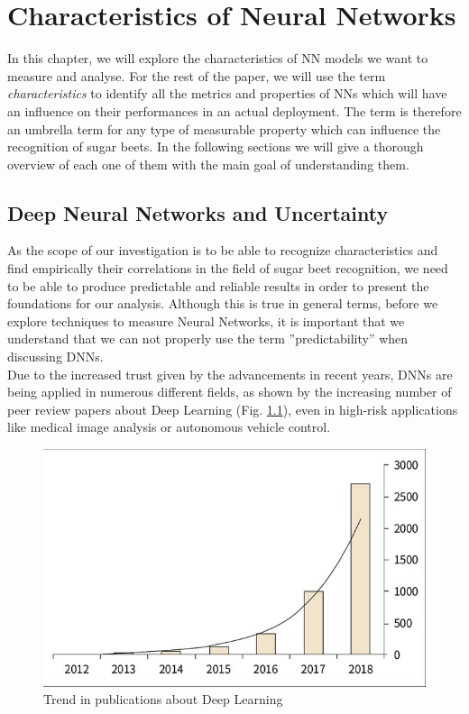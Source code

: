 \chapter{Characteristics of Neural Networks}\label{char_nn}
In this chapter, we will explore the characteristics of NN models we want to measure and analyse. For the rest of the paper, we will use the term \textit{characteristics} to identify all the metrics and properties of NNs which will have an influence on their performances in an actual deployment. The term is therefore an umbrella term for any type of measurable property which can influence the recognition of sugar beets. In the following sections we will give a thorough overview of each one of them with the main goal of understanding them. 

\section{Deep Neural Networks and Uncertainty}
As the scope of our investigation is to be able to recognize characteristics and find empirically their correlations in the field of sugar beet recognition, we need to be able to produce predictable and reliable results in order to present the foundations for our analysis. Although this is true in general terms, before we explore techniques to measure Neural Networks, it is important that we understand that we can not properly use the term ''predictability'' when discussing DNNs. \\
Due to the increased trust given by the advancements in recent years, DNNs are being applied in numerous different fields, as shown by the increasing number of peer review papers about Deep Learning (Fig. \ref{fig:annual_trend}), even in high-risk applications
like medical image analysis or autonomous vehicle control. \cite{gawlikowski2021survey}
\begin{figure}[h]
    \centering
    \includegraphics{img/Annual-trend-in-the-number-of-papers-related-to-deep-learning-in-the-medical-field_W640.jpg}
    \caption[Trend in publications about Deep Learning]{Trend in publications about Deep Learning  \cite{Number_of_DL_papers}}
    \label{fig:annual_trend}
\end{figure}


